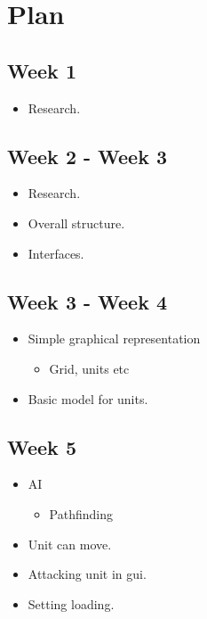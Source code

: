 

\section{Plan}
	\subsection{Week 1}
	\label{week1}

	\begin{itemize}
	\item Research.

	\end{itemize}

	\subsection{Week 2 - Week 3}
	\label{week2-week3}

	\begin{itemize}
	\item Research.

	\item Overall structure.

	\item Interfaces.

	\end{itemize}

	\subsection{Week 3 - Week 4}
	\label{week3-week4}

	\begin{itemize}
	\item Simple graphical representation

	\begin{itemize}
	\item Grid, units etc

	\end{itemize}

	\item Basic model for units.

	\end{itemize}

	\subsection{Week 5}
	\label{week5}

	\begin{itemize}
	\item AI

	\begin{itemize}
	\item Pathfinding

	\end{itemize}

	\item Unit can move.

	\item Attacking unit in gui.

	\item Setting loading.

	\end{itemize}

